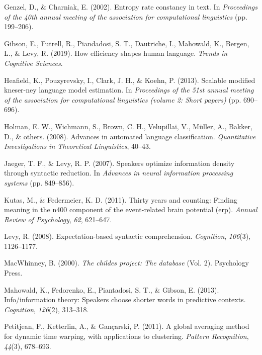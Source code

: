 \documentclass[10pt, letterpaper]{article}
\begin{document}
\leavevmode\hypertarget{ref-genzel2002}{}%
Genzel, D., \& Charniak, E. (2002). Entropy rate constancy in text. In
\emph{Proceedings of the 40th annual meeting of the association for
computational linguistics} (pp. 199--206).

\leavevmode\hypertarget{ref-gibson2019}{}%
Gibson, E., Futrell, R., Piandadosi, S. T., Dautriche, I., Mahowald, K.,
Bergen, L., \& Levy, R. (2019). How efficiency shapes human language.
\emph{Trends in Cognitive Sciences}.

\leavevmode\hypertarget{ref-heafield2013}{}%
Heafield, K., Pouzyrevsky, I., Clark, J. H., \& Koehn, P. (2013).
Scalable modified kneser-ney language model estimation. In
\emph{Proceedings of the 51st annual meeting of the association for
computational linguistics (volume 2: Short papers)} (pp. 690--696).

\leavevmode\hypertarget{ref-holman2008}{}%
Holman, E. W., Wichmann, S., Brown, C. H., Velupillai, V., Müller, A.,
Bakker, D., \& others. (2008). Advances in automated language
classification. \emph{Quantitative Investigations in Theoretical
Linguistics}, 40--43.

\leavevmode\hypertarget{ref-jaeger2007}{}%
Jaeger, T. F., \& Levy, R. P. (2007). Speakers optimize information
density through syntactic reduction. In \emph{Advances in neural
information processing systems} (pp. 849--856).

\leavevmode\hypertarget{ref-kutas2011}{}%
Kutas, M., \& Federmeier, K. D. (2011). Thirty years and counting:
Finding meaning in the n400 component of the event-related brain
potential (erp). \emph{Annual Review of Psychology}, \emph{62},
621--647.

\leavevmode\hypertarget{ref-levy2008}{}%
Levy, R. (2008). Expectation-based syntactic comprehension.
\emph{Cognition}, \emph{106}(3), 1126--1177.

\leavevmode\hypertarget{ref-macwhinney2000}{}%
MacWhinney, B. (2000). \emph{The childes project: The database} (Vol.
2). Psychology Press.

\leavevmode\hypertarget{ref-mahowald2013}{}%
Mahowald, K., Fedorenko, E., Piantadosi, S. T., \& Gibson, E. (2013).
Info/information theory: Speakers choose shorter words in predictive
contexts. \emph{Cognition}, \emph{126}(2), 313--318.

\leavevmode\hypertarget{ref-petitjean2011}{}%
Petitjean, F., Ketterlin, A., \& Gançarski, P. (2011). A global
averaging method for dynamic time warping, with applications to
clustering. \emph{Pattern Recognition}, \emph{44}(3), 678--693.
\end{document}
